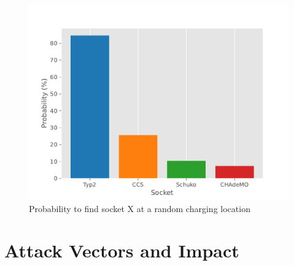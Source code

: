 \documentclass[conference,flushend]{iaria} %
\begin{document}
\begin{figure}[ht]
    \centering
    \includegraphics[width=.489\textwidth]{graphs/socket_probability.pdf}
    \caption{Probability to find socket X at a random charging location}
    \label{fig:socketsprob}
\end{figure}

\section{Attack Vectors and Impact}
\end{document}
